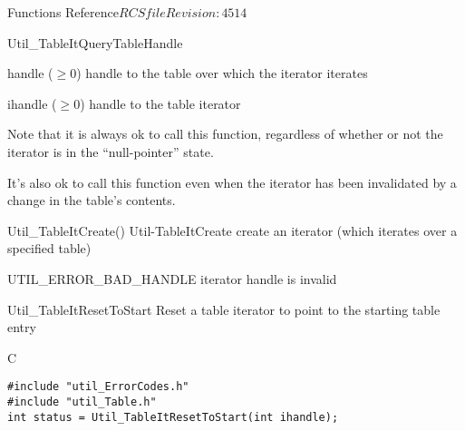 \begin{cactuspart}{ Functions Reference}{$RCSfile$}{$Revision: 4514 $}
\begin{FunctionDescription}{Util\_TableItQueryTableHandle}
\begin{ResultSection}
\begin{Result}{handle ($\ge 0$)}
handle to the table over which the iterator iterates
\end{Result}
\end{ResultSection}

\begin{ParameterSection}
\begin{Parameter}{ihandle ($\ge 0$)}
handle to the table iterator
\end{Parameter}
\end{ParameterSection}

\begin{Discussion}
Note that it is always ok to call this function, regardless of
whether or not the iterator is in the ``null-pointer'' state.

It's also ok to call this function even when the iterator has been
invalidated by a change in the table's contents.
\end{Discussion}

\begin{SeeAlsoSection}
\begin{SeeAlso2} {Util\_TableItCreate()} {Util-TableItCreate}
create an iterator (which iterates over a specified table)
\end{SeeAlso2}
\end{SeeAlsoSection}

\begin{ErrorSection}
\begin{Error}{UTIL\_ERROR\_BAD\_HANDLE}
iterator handle is invalid
\end{Error}
\end{ErrorSection}
\end{FunctionDescription}


\begin{FunctionDescription}{Util\_TableItResetToStart}
\label{Util-TableItResetToStart}
Reset a table iterator to point to the starting table entry

\begin{SynopsisSection}
\begin{Synopsis}{C}
\begin{verbatim}
#include "util_ErrorCodes.h"
#include "util_Table.h"
int status = Util_TableItResetToStart(int ihandle);
\end{verbatim}
\end{Synopsis}
\end{SynopsisSection}


\end{FunctionDescription}
\end{cactuspart}
